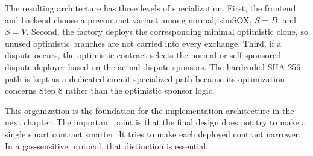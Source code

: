 The resulting architecture has three levels of specialization. First, the frontend and
backend choose a precontract variant among normal, simSOX, \(S=B\), and \(S=V\). Second, the
factory deploys the corresponding minimal optimistic clone, so unused optimistic branches
are not carried into every exchange. Third, if a dispute occurs, the optimistic contract
selects the normal or self-sponsored dispute deployer based on the actual dispute sponsors.
The hardcoded SHA-256 path is kept as a dedicated circuit-specialized path because its
optimization concerns Step 8 rather than the optimistic sponsor logic.

This organization is the foundation for the implementation architecture in the next
chapter. The important point is that the final design does not try to make a single smart
contract smarter. It tries to make each deployed contract narrower. In a gas-sensitive
protocol, that distinction is essential.
